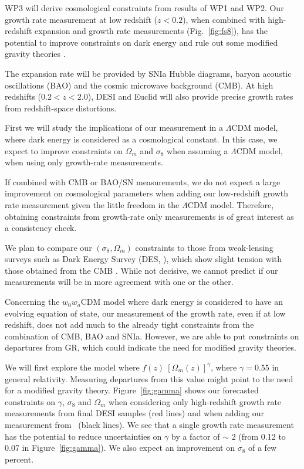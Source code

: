 \newpage

WP3 will derive cosmological constraints from results of WP1 and WP2. 
Our growth rate measurement at low redshift ($z<0.2$),  
when combined with high-redshift expansion and growth rate measurements (Fig.~\ref{fig:fs8}),
has the potential to improve constraints on dark energy and 
rule out some modified gravity theories \cite{kimTestingGravityUsing2019}.

The expansion rate will be provided by 
SNIa Hubble diagrams, baryon acoustic oscillations (BAO) and the cosmic microwave background (CMB). 
At high redshifts ($0.2<z<2.0$), DESI and Euclid will also provide precise growth rates 
from redshift-space distortions. 

  First we will study the implications of our measurement in a $\Lambda$CDM model, where 
  dark energy is considered as a cosmological constant. 
  In this case, we expect to improve constraints on 
  $\Omega_m$ and $\sigma_8$ when assuming a $\Lambda$CDM model, when using 
  only growth-rate measurements.
  
  If combined with CMB or BAO/SN measurements, we do not expect a large improvement
  on cosmological parameters when adding our low-redshift growth rate measurement 
  given the little freedom in the $\Lambda$CDM model. Therefore, 
  obtaining constraints from growth-rate only measurements is of great interest 
  as a consistency check. 

  We plan to compare our $(\sigma_8,\Omega_m)$ constraints to those from 
  weak-lensing surveys such as Dark Energy Survey 
  (DES, \cite{collaborationDarkEnergySurvey2026}),
  which show slight tension with those obtained from the 
  CMB \cite{planckcollaborationPlanck2018Results2020a}.
  While not decisive, we cannot predict if our measurements will be in 
  more agreement with one or the other.  
  
  Concerning the  $w_0w_a$CDM model where dark energy is considered to have 
  an evolving equation of state, our measurement of the growth rate, even if 
  at low redshift, does not add much to the already tight constraints from 
  the combination of CMB, BAO and SNIa. However, we are able to 
  put constraints on departures from GR, which could indicate the need 
  for modified gravity theories. 

  We will first explore the model where $f(z) ~ [\Omega_m(z)]^\gamma$,
  where $\gamma = 0.55$ in general relativity. Measuring departures 
  from this value might point to the need for a modified gravity theory. 
  Figure~\ref{fig:gamma} shows our forecasted constraints on $\gamma$, 
  $\sigma_8$ and $\Omega_m$ when considering only high-redshift growth 
  rate measurements from final DESI samples (red lines) and when 
  adding our measurement from \projacro\ (black lines). 
  We see that a single growth rate measurement has the potential to reduce 
  uncertainties on $\gamma$ by a factor of $\sim$ 2 
  (from 0.12 to 0.07 in Figure~\ref{fig:gamma}). We also expect 
  an improvement on $\sigma_8$ of a few percent. 


